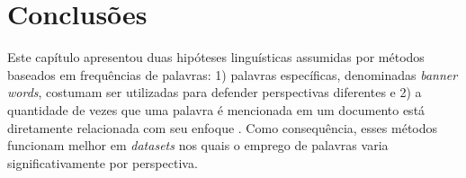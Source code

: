 

\section{Conclusões}
\label{freqs:conc}

Este capítulo apresentou duas hipóteses linguísticas assumidas por métodos baseados em frequências de palavras: 1) palavras específicas, denominadas \emph{banner words}, costumam ser utilizadas para defender perspectivas diferentes e 2) a quantidade de vezes que uma palavra é mencionada em um documento está diretamente relacionada com seu enfoque \cite{teubert2001}. Como consequência, esses métodos funcionam melhor em \emph{datasets} nos quais o emprego de palavras varia significativamente por perspectiva. %

